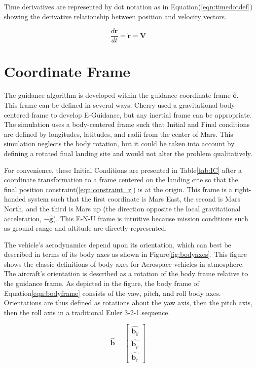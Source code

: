 Time derivatives are represented by dot notation as in Equation\:(\ref{eqn:timedotdef}) showing the derivative relationship between position and velocity vectors.

\begin{equation}
\label{eqn:timedotdef}
\frac{d\bm{r}}{dt} = \dot{\bm{r}} = \bm{V}
\end{equation}


\section{Coordinate Frame}
The guidance algorithm is developed within the guidance coordinate frame $\bm{\hat{e}}$. This frame can be defined in several ways. Cherry\:\cite{CHERRY} used a gravitational body-centered frame to develop E-Guidance, but any inertial frame can be appropriate. The simulation uses a body-centered frame such that Initial and Final conditions are defined by longitudes, latitudes, and radii from the center of Mars. This simulation neglects the body rotation, but it could be taken into account by defining a rotated final landing site and would not alter the problem qualitatively. 

For convenience, these Initial Conditions are presented in Table\:\ref{tab:IC} after a coordinate transformation to a frame centered on the landing cite so that the final position constraint\:(\ref{eqn:constraint_r}) is at the origin. This frame is a right-handed system such that the first coordinate is Mars East, the second is Mars North, and the third is Mars up (the direction opposite the local gravitational acceleration, $-\hat{\bm{g}}$). This E-N-U frame is intuitive because mission conditions such as ground range and altitude are directly represented.  

The vehicle's aerodynamics depend upon its orientation, which can best be described in terms of its body axes as shown in Figure\:\ref{fig:bodyaxes}. This figure shows the classic definitions of body axes for Aerospace vehicles in atmosphere. The aircraft's orientation is described as a rotation of the body frame relative to the guidance frame. As depicted in the figure, the body frame of Equation\:\ref{eqn:bodyframe} consists of the yaw, pitch, and roll body axes. Orientations are thus defined as rotations about the yaw axis, then the pitch axis, then the roll axis in a traditional Euler 3-2-1 sequence.

\begin{equation}
\label{eqn:bodyframe}
\hat{\bm{b}} = 
\begin{bmatrix}
\hat{\bm{b}_y} \\
\hat{\bm{b}_p} \\
\hat{\bm{b}_r}
\end{bmatrix}
\end{equation}


